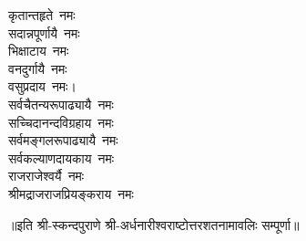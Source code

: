 \begin{multicols}{2}
\begin{flushleft}
कृतान्तहृते~नमः\\
सदान्नपूर्णायै~नमः\\
भिक्षाटाय~नमः\\
वनदुर्गायै~नमः\\
वसुप्रदाय~नमः।\hfill{}\\
सर्वचैतन्यरूपाढ्यायै~नमः\\
सच्चिदानन्दविग्रहाय~नमः\\
सर्वमङ्गलरूपाढ्यायै~नमः\\
सर्वकल्याणदायकाय~नमः\\
राजराजेश्वर्यै~नमः\\
श्रीमद्राजराजप्रियङ्कराय~नमः\\
\end{flushleft}
\end{multicols}
॥इति श्री-स्कन्दपुराणे श्री-अर्धनारीश्वराष्टोत्तरशतनामावलिः सम्पूर्णा॥